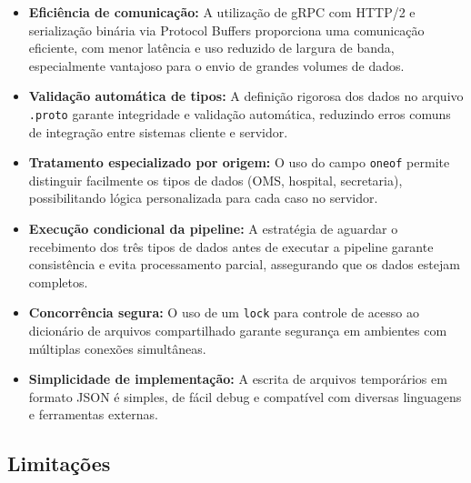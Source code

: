 \documentclass{article}
\begin{document}
\begin{itemize}
    \item \textbf{Eficiência de comunicação:} A utilização de gRPC com HTTP/2 e serialização binária via Protocol Buffers proporciona uma comunicação eficiente, com menor latência e uso reduzido de largura de banda, especialmente vantajoso para o envio de grandes volumes de dados.

    \item \textbf{Validação automática de tipos:} A definição rigorosa dos dados no arquivo \texttt{.proto} garante integridade e validação automática, reduzindo erros comuns de integração entre sistemas cliente e servidor.

    \item \textbf{Tratamento especializado por origem:} O uso do campo \texttt{oneof} permite distinguir facilmente os tipos de dados (OMS, hospital, secretaria), possibilitando lógica personalizada para cada caso no servidor.

    \item \textbf{Execução condicional da pipeline:} A estratégia de aguardar o recebimento dos três tipos de dados antes de executar a pipeline garante consistência e evita processamento parcial, assegurando que os dados estejam completos.

    \item \textbf{Concorrência segura:} O uso de um \texttt{lock} para controle de acesso ao dicionário de arquivos compartilhado garante segurança em ambientes com múltiplas conexões simultâneas.

    \item \textbf{Simplicidade de implementação:} A escrita de arquivos temporários em formato JSON é simples, de fácil debug e compatível com diversas linguagens e ferramentas externas.

\end{itemize}

\subsection{Limitações}
\end{document}
